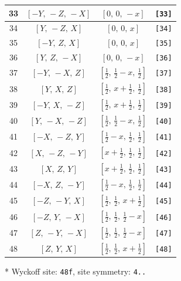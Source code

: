\documentclass[fleqn,8pt]{jsarticle}
\begin{document}
\begin{longtable}{cccc}
33 & $\left[ - Y,\, - Z,\, - X \right]$ & $\left[ 0,\, 0,\, - x \right]$ & {\tt [33]} \\ \hline
34 & $\left[ Y,\, - Z,\, X \right]$ & $\left[ 0,\, 0,\, x \right]$ & {\tt [34]} \\ \hline
35 & $\left[ - Y,\, Z,\, X \right]$ & $\left[ 0,\, 0,\, x \right]$ & {\tt [35]} \\ \hline
36 & $\left[ Y,\, Z,\, - X \right]$ & $\left[ 0,\, 0,\, - x \right]$ & {\tt [36]} \\ \hline
37 & $\left[ - Y,\, - X,\, Z \right]$ & $\left[ \frac{1}{2},\, \frac{1}{2} - x,\, \frac{1}{2} \right]$ & {\tt [37]} \\ \hline
38 & $\left[ Y,\, X,\, Z \right]$ & $\left[ \frac{1}{2},\, x + \frac{1}{2},\, \frac{1}{2} \right]$ & {\tt [38]} \\ \hline
39 & $\left[ - Y,\, X,\, - Z \right]$ & $\left[ \frac{1}{2},\, x + \frac{1}{2},\, \frac{1}{2} \right]$ & {\tt [39]} \\ \hline
40 & $\left[ Y,\, - X,\, - Z \right]$ & $\left[ \frac{1}{2},\, \frac{1}{2} - x,\, \frac{1}{2} \right]$ & {\tt [40]} \\ \hline
41 & $\left[ - X,\, - Z,\, Y \right]$ & $\left[ \frac{1}{2} - x,\, \frac{1}{2},\, \frac{1}{2} \right]$ & {\tt [41]} \\ \hline
42 & $\left[ X,\, - Z,\, - Y \right]$ & $\left[ x + \frac{1}{2},\, \frac{1}{2},\, \frac{1}{2} \right]$ & {\tt [42]} \\ \hline
43 & $\left[ X,\, Z,\, Y \right]$ & $\left[ x + \frac{1}{2},\, \frac{1}{2},\, \frac{1}{2} \right]$ & {\tt [43]} \\ \hline
44 & $\left[ - X,\, Z,\, - Y \right]$ & $\left[ \frac{1}{2} - x,\, \frac{1}{2},\, \frac{1}{2} \right]$ & {\tt [44]} \\ \hline
45 & $\left[ - Z,\, - Y,\, X \right]$ & $\left[ \frac{1}{2},\, \frac{1}{2},\, x + \frac{1}{2} \right]$ & {\tt [45]} \\ \hline
46 & $\left[ - Z,\, Y,\, - X \right]$ & $\left[ \frac{1}{2},\, \frac{1}{2},\, \frac{1}{2} - x \right]$ & {\tt [46]} \\ \hline
47 & $\left[ Z,\, - Y,\, - X \right]$ & $\left[ \frac{1}{2},\, \frac{1}{2},\, \frac{1}{2} - x \right]$ & {\tt [47]} \\ \hline
48 & $\left[ Z,\, Y,\, X \right]$ & $\left[ \frac{1}{2},\, \frac{1}{2},\, x + \frac{1}{2} \right]$ & {\tt [48]} \\
\end{longtable}
* Wyckoff site: {\tt 48f}, site symmetry: {\tt 4..}
\end{document}

